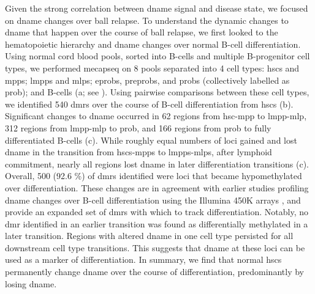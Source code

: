 Given the strong correlation between \gls{dname} signal and disease state, we focused on \gls{dname} changes over \gls{ball} relapse.
To understand the dynamic changes to \gls{dname} that happen over the course of \gls{ball} relapse, we first looked to the hematopoietic hierarchy and \gls{dname} changes over normal B-cell differentiation.
Using normal cord blood pools, sorted into B-cells and multiple B-progenitor cell types, we performed \gls{mecapseq} on 8 pools separated into 4 cell types: \glspl{hsc} and \glspl{mpp}; \glspl{lmpp} and \glspl{mlp}; \glspl{eprob}, \glspl{preprob}, and \glspl{prob} (collectively labelled as \gls{prob}); and B-cells (a; see ).
Using pairwise comparisons between these cell types, we identified 540 \glspl{dmr} over the course of B-cell differentiation from \glspl{hsc} (b).
Significant changes to \gls{dname} occurred in 62 regions from \gls{hsc}-\gls{mpp} to \gls{lmpp}-\gls{mlp}, 312 regions from \gls{lmpp}-\gls{mlp} to \gls{prob}, and 166 regions from \gls{prob} to fully differentiated B-cells (c).
While roughly equal numbers of loci gained and lost \gls{dname} in the transition from \glspl{hsc}-\glspl{mpp} to \glspl{lmpp}-\glspl{mlp}, after lymphoid commitment, nearly all regions lost \gls{dname} in later differentiation transitions (c).
Overall, 500 (92.6 \%) of \glspl{dmr} identified were loci that became hypomethylated over differentiation.
These changes are in agreement with earlier studies profiling \gls{dname} changes over B-cell differentiation using the Illumina 450K arrays \cite{leeGlobalDNAMethylation2012,leeEpigeneticRemodelingBcell2015,nordlundGenomewideSignaturesDifferential2013}, and provide an expanded set of \glspl{dmr} with which to track differentiation.
Notably, no \gls{dmr} identified in an earlier transition was found as differentially methylated in a later transition.
Regions with altered \gls{dname} in one cell type persisted for all downstream cell type transitions.
This suggests that \gls{dname} at these loci can be used as a marker of differentiation.
In summary, we find that normal \glspl{hsc} permanently change \gls{dname} over the course of differentiation, predominantly by losing \gls{dname}.



